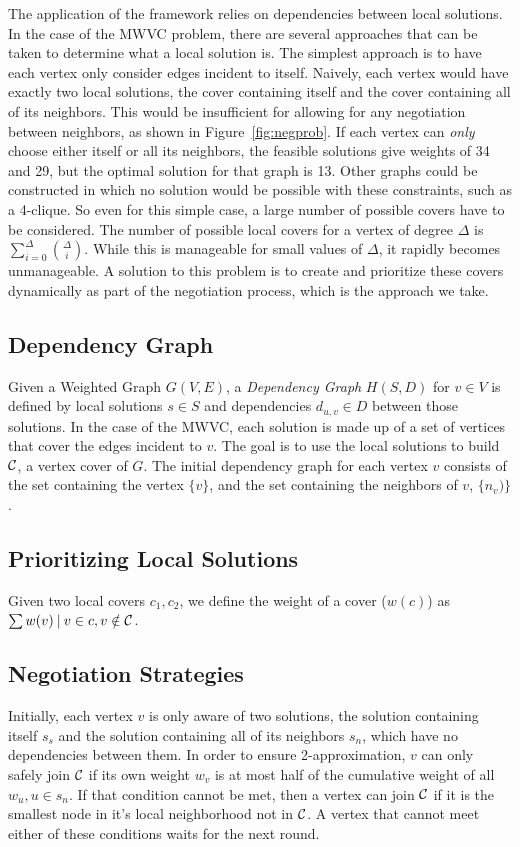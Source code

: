 The application of the framework relies on dependencies between local solutions. In the case of the MWVC problem, there are several approaches that can be taken to determine what a local solution is. The simplest approach is to have each vertex only consider edges incident to itself. Naively, each vertex would have exactly two local solutions, the cover containing itself and the cover containing all of its neighbors. This would be insufficient for allowing for any negotiation between neighbors, as shown in Figure~\ref{fig:negprob}. If each vertex can {\em only} choose either itself or all its neighbors, the feasible solutions give weights of 34 and 29, but the optimal solution for that graph is 13. Other graphs could be constructed in which no solution would be possible with these constraints, such as a 4-clique. So even for this simple case, a large number of possible covers have to be considered. The number of possible local covers for a vertex of degree $\Delta$ is $\sum_{i=0}^\Delta \binom{\Delta}{i}$. While this is manageable for small values of $\Delta$, it rapidly becomes unmanageable. A solution to this problem is to create and prioritize these covers dynamically as part of the negotiation process, which is the approach we take.

\subsection{Dependency Graph}
Given a Weighted Graph $G(V,E)$, a {\em Dependency Graph} $H(S,D)$ for $v \in V$ is defined by local solutions $s \in S$ and dependencies $d_{u,v} \in D$ between those solutions. In the case of the MWVC, each solution is made up of a set of vertices that cover the edges incident to $v$. The goal is to use the local solutions to build ${\mathcal C}$, a vertex cover of $G$. The initial dependency graph for each vertex $v$ consists of the set containing the vertex $\{v\}$, and the set containing the neighbors of $v$, $\{n_v)\}$. 

\subsection{Prioritizing Local Solutions}

Given two local covers $c_1, c_2$, we define the weight of a cover ($w(c)$) as $\sum w(v)\:|\: v \in c, v \notin {\mathcal C}$. 

\subsection{Negotiation Strategies}
Initially, each vertex $v$ is only aware of two solutions, the solution containing itself $s_s$ and the solution containing all of its neighbors $s_n$, which have no dependencies between them. In order to ensure 2-approximation, $v$ can only safely join ${\mathcal C}$ if its own weight $w_v$ is at most half of the cumulative weight of all $w_u, u \in s_n $. If that condition cannot be met, then a vertex can join ${\mathcal C}$ if it is the smallest node in it's local neighborhood not in ${\mathcal C}$. A vertex that cannot meet either of these conditions waits for the next round. 

